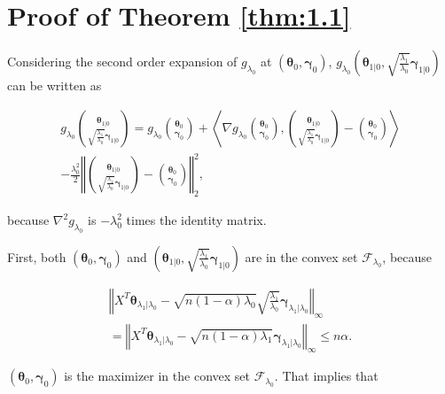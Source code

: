 \section{Proof of Theorem \ref{thm:1.1}}


Considering the second order expansion of $g_{\lambda_0}$ at $(\boldsymbol\theta_{0},\boldsymbol\gamma_{0})$, $g_{\lambda_0}\left(\boldsymbol\theta_{1|0},\sqrt{\frac{\lambda_1}{\lambda_0}}\boldsymbol\gamma_{1|0}\right)$ can be written as


\begin{equation}
    \label{eq:1.1.1}
    \begin{aligned}
        g_{\lambda_0}\binom{\boldsymbol\theta_{1|0}}{\sqrt{\frac{\lambda_1}{\lambda_0}}\boldsymbol\gamma_{1|0}}=g_{\lambda_0}\binom{\boldsymbol\theta_{0}}{\boldsymbol\gamma_{0}}+\left\langle\nabla g_{\lambda_0}\binom{\boldsymbol\theta_{0}}{\boldsymbol\gamma_{0}},\binom{\boldsymbol\theta_{1|0}}{\sqrt{\frac{\lambda_1}{\lambda_0}}\boldsymbol\gamma_{1|0}}-\binom{\boldsymbol\theta_{0}}{\boldsymbol\gamma_{0}}\right\rangle\\-\frac{\lambda_0^2}{2}\left\Vert\binom{\boldsymbol\theta_{1|0}}{\sqrt{\frac{\lambda_1}{\lambda_0}}\boldsymbol\gamma_{1|0}}-\binom{\boldsymbol\theta_{0}}{\boldsymbol\gamma_{0}}\right\Vert_2^2,
    \end{aligned}
\end{equation}

because $\nabla^2g_{\lambda_0}$ is $-\lambda_0^2$ times the identity matrix. 

First, both $(\boldsymbol\theta_{0},\boldsymbol\gamma_{0})$ and $\left(\boldsymbol\theta_{1|0},\sqrt{\frac{\lambda_1}{\lambda_0}}\boldsymbol\gamma_{1|0}\right)$ are in the convex set $\mathcal{F}_{\lambda_0}$, because

\begin{equation}
    \begin{aligned}
        \left\Vert X^T\boldsymbol\theta_{\lambda_1|\lambda_0}-\sqrt{n(1-\alpha)\lambda_0}\sqrt{\frac{\lambda_1}{\lambda_0}}\boldsymbol\gamma_{\lambda_1|\lambda_0}\right\Vert_\infty\\= \left\Vert X^T\boldsymbol\theta_{\lambda_1|\lambda_0}-\sqrt{n(1-\alpha)\lambda_1}\boldsymbol\gamma_{\lambda_1|\lambda_0}\right\Vert_\infty\leq n\alpha.
    \end{aligned}
\end{equation}

$(\boldsymbol\theta_{0},\boldsymbol\gamma_{0})$ is the maximizer in the convex set $\mathcal{F}_{\lambda_0}$. That implies that

